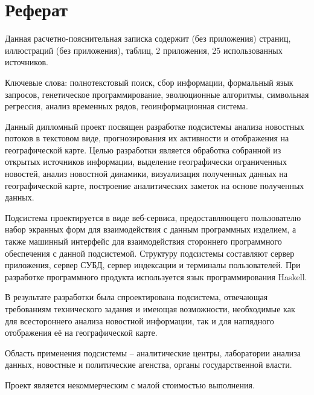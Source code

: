 \section*{Реферат}

Данная расчетно-пояснительная записка содержит \pageref{preLastPage} (без приложения) страниц,  иллюстраций (без приложения),  таблиц, 2 приложения, 25 использованных источников.

Ключевые слова: полнотекстовый поиск, сбор информации, формальный язык запросов, генетическое программирование, эволюционные алгоритмы, символьная регрессия, анализ временных рядов, геоинформационная система.

Данный дипломный проект посвящен разработке подсистемы анализа новостных потоков в текстовом виде, прогнозирования их активности и отображения на географической карте. Целью разработки является обработка собранной из открытых источников информации, выделение географически ограниченных новостей, анализ новостной динамики, визуализация полученных данных на географической карте, построение аналитических заметок на основе полученных данных.

Подсистема проектируется в виде веб-сервиса, предоставляющего пользователю набор экранных форм для взаимодействия с данным программных изделием, а также машинный интерфейс для взаимодействия стороннего программного обеспечения с данной подсистемой. Структуру подсистемы составляют сервер приложения, сервер СУБД, сервер индексации и терминалы пользователей. При разработке программного продукта используется язык программирования Haskell.

В результате разработки была спроектирована подсистема, отвечающая требованиям технического задания и имеющая возможности, необходимые как для всестороннего анализа новостной информации, так и для наглядного отображения её на географической карте. 

Область применения подсистемы -- аналитические центры, лаборатории анализа данных, новостные и политические агенства, органы государственной власти.

Проект является некоммерческим с малой стоимостью выполнения.